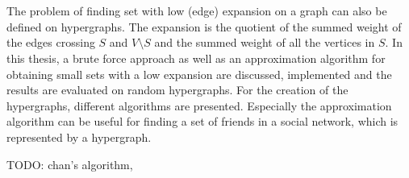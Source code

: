 \chapter{\abstractname}

The problem of finding set with low (edge) expansion on a graph can also be defined on hypergraphs. The expansion is the quotient of the summed weight of the edges crossing $S$ and $V\setminus S$ and the summed weight of all the vertices in $S$.
In this thesis, a brute force approach as well as an approximation algorithm for obtaining small sets with a low expansion are discussed, implemented and the results are evaluated on random hypergraphs. For the creation of the hypergraphs, different algorithms are presented. Especially the approximation algorithm can be useful for finding a set of friends in a social network, which is represented by a hypergraph.

TODO: chan's algorithm, 

